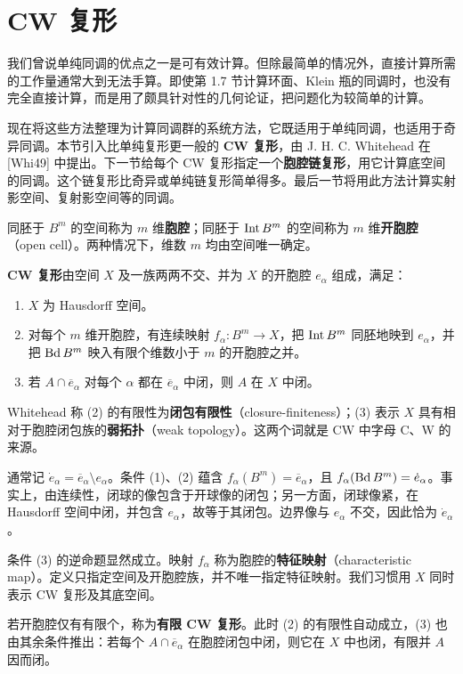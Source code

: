 \section{CW 复形}
我们曾说单纯同调的优点之一是可有效计算。但除最简单的情况外，直接计算所需的工作量通常大到无法手算。即使第 1.7 节计算环面、Klein 瓶的同调时，也没有完全直接计算，而是用了颇具针对性的几何论证，把问题化为较简单的计算。

现在将这些方法整理为计算同调群的系统方法，它既适用于单纯同调，也适用于奇异同调。本节引入比单纯复形更一般的 \textbf{CW 复形}，由 J. H. C. Whitehead 在 [Whi49] 中提出。下一节给每个 CW 复形指定一个\textbf{胞腔链复形}，用它计算底空间的同调。这个链复形比奇异或单纯链复形简单得多。最后一节将用此方法计算实射影空间、复射影空间等的同调。

同胚于 $B^m$ 的空间称为 $m$ 维\textbf{胞腔}；同胚于 $\operatorname{Int} B^m$ 的空间称为 $m$ 维\textbf{开胞腔}（open cell）。两种情况下，维数 $m$ 均由空间唯一确定。

\textbf{CW 复形}由空间 $X$ 及一族两两不交、并为 $X$ 的开胞腔 $e_\alpha$ 组成，满足：
\begin{enumerate}[label=(\arabic*)]
\item $X$ 为 Hausdorff 空间。
\item 对每个 $m$ 维开胞腔，有连续映射 $f_\alpha:B^m\to X$，把 $\operatorname{Int} B^m$ 同胚地映到 $e_\alpha$，并把 $\operatorname{Bd} B^m$ 映入有限个维数小于 $m$ 的开胞腔之并。
\item 若 $A\cap\overline e_\alpha$ 对每个 $\alpha$ 都在 $\overline e_\alpha$ 中闭，则 $A$ 在 $X$ 中闭。
\end{enumerate}
Whitehead 称 (2) 的有限性为\textbf{闭包有限性}（closure-finiteness）；(3) 表示 $X$ 具有相对于胞腔闭包族的\textbf{弱拓扑}（weak topology）。这两个词就是 CW 中字母 C、W 的来源。

通常记 $\dot e_\alpha=\overline e_\alpha\setminus e_\alpha$。条件 (1)、(2) 蕴含 $f_\alpha(B^m)=\overline e_\alpha$，且 $f_\alpha(\operatorname{Bd} B^m)=\dot e_\alpha$。事实上，由连续性，闭球的像包含于开球像的闭包；另一方面，闭球像紧，在 Hausdorff 空间中闭，并包含 $e_\alpha$，故等于其闭包。边界像与 $e_\alpha$ 不交，因此恰为 $\dot e_\alpha$。

条件 (3) 的逆命题显然成立。映射 $f_\alpha$ 称为胞腔的\textbf{特征映射}（characteristic map）。定义只指定空间及开胞腔族，并不唯一指定特征映射。我们习惯用 $X$ 同时表示 CW 复形及其底空间。

若开胞腔仅有有限个，称为\textbf{有限 CW 复形}。此时 (2) 的有限性自动成立，(3) 也由其余条件推出：若每个 $A\cap\overline e_\alpha$ 在胞腔闭包中闭，则它在 $X$ 中也闭，有限并 $A$ 因而闭。

